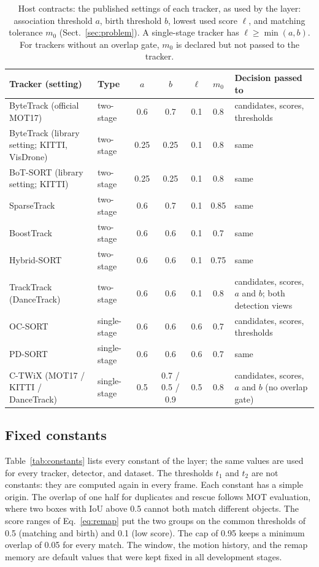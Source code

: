 \documentclass[pdflatex,sn-mathphys-num]{sn-jnl}
\begin{document}
\begin{table}[t]
\caption{Host contracts: the published settings of each tracker, as used by
the layer: association threshold $a$, birth threshold $b$, lowest used score
$\ell$, and matching tolerance $m_0$ (Sect.~\ref{sec:problem}). A single-stage tracker has $\ell\ge\min(a,b)$. For trackers without
an overlap gate, $m_0$ is declared but not passed to the tracker.}
\label{tab:contracts}
\centering\footnotesize
\setlength{\tabcolsep}{3pt}
\begin{tabular}{@{}>{\raggedright\arraybackslash}p{37mm}lcccc>{\raggedright\arraybackslash}p{29mm}@{}}
\toprule
Tracker (setting) & Type & $a$ & $b$ & $\ell$ & $m_0$ & Decision passed to\\
\midrule
ByteTrack (official MOT17) & two-stage & 0.6 & 0.7 & 0.1 & 0.8 & candidates, scores, thresholds\\
ByteTrack (library setting; KITTI, VisDrone) & two-stage & 0.25 & 0.25 & 0.1 & 0.8 & same\\
BoT-SORT (library setting; KITTI) & two-stage & 0.25 & 0.25 & 0.1 & 0.8 & same\\
SparseTrack & two-stage & 0.6 & 0.7 & 0.1 & 0.85 & same\\
BoostTrack & two-stage & 0.6 & 0.6 & 0.1 & 0.7 & same\\
Hybrid-SORT & two-stage & 0.6 & 0.6 & 0.1 & 0.75 & same\\
TrackTrack (DanceTrack) & two-stage & 0.6 & 0.6 & 0.1 & 0.8 & candidates, scores, $a$ and $b$; both detection views\\
OC-SORT & single-stage & 0.6 & 0.6 & 0.6 & 0.7 & candidates, scores, thresholds\\
PD-SORT & single-stage & 0.6 & 0.6 & 0.6 & 0.7 & same\\
C-TWiX (MOT17 / KITTI / DanceTrack) & single-stage & 0.5 & 0.7 / 0.5 / 0.9 & 0.5 & 0.8 & candidates, scores, $a$ and $b$ (no overlap gate)\\
\bottomrule
\end{tabular}
\end{table}

\subsection{Fixed constants}\label{sec:constants}
Table~\ref{tab:constants} lists every constant of the layer; the same values
are used for every tracker, detector, and dataset. The thresholds $t_1$ and
$t_2$ are not constants: they are computed again in every frame. Each
constant has a simple origin. The overlap of one half for duplicates and
rescue follows MOT evaluation, where two boxes with IoU above 0.5 cannot both
match different objects. The score ranges of Eq.~\eqref{eq:remap} put the two
groups on the common thresholds of 0.5 (matching and birth) and 0.1 (low
score). The cap of 0.95 keeps a minimum overlap of 0.05 for every match. The
window, the motion history, and the remap memory are default values that were
kept fixed in all development stages.
\end{document}
